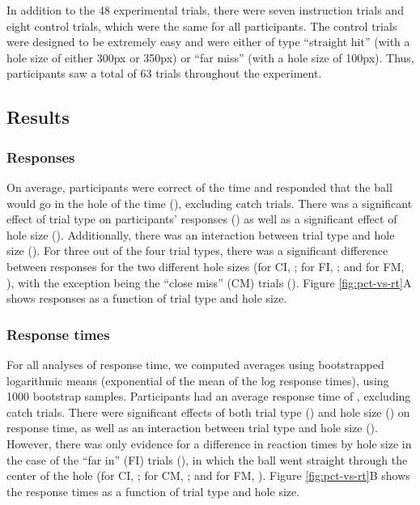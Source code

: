 \documentclass[10pt,letterpaper]{article}
\begin{document}
In addition to the 48 experimental trials, there were seven instruction trials and eight control trials, which were the same for all participants.
The control trials were designed to be extremely easy and were either of type ``straight hit'' (with a hole size of either 300px or 350px) or ``far miss'' (with a hole size of 100px).
Thus, participants saw a total of 63 trials throughout the experiment.

\subsection{Results}

\subsubsection{Responses}

On average, participants were correct \AvgCorrect{} of the time and responded that the ball would go in the hole \AvgResponse{} of the time (\ResponseN{}), excluding catch trials.
There was a significant effect of trial type on participants' responses (\ResponseHoleClass{}) as well as a significant effect of hole size (\ResponseHoleSize{}).
Additionally, there was an interaction between trial type and hole size (\ResponseFull{}).
For three out of the four trial types, there was a significant difference between responses for the two different hole sizes (for CI, \ResponseCIttest{}; for FI, \ResponseCIttest{}; and for FM, \ResponseFMttest{}), with the exception being the ``close miss'' (CM) trials (\ResponseCMttest{}).
Figure \ref{fig:pct-vs-rt}A shows responses as a function of trial type and hole size.

\subsubsection{Response times}

For all analyses of response time, we computed averages using bootstrapped logarithmic means (exponential of the mean of the log response times), using 1000 bootstrap samples.
Participants had an average response time of \AvgRT{}, excluding catch trials.
There were significant effects of both trial type (\RTHoleClass{}) and hole size (\RTHoleSize{}) on response time, as well as an interaction between trial type and hole size (\RTFull{}).
However, there was only evidence for a difference in reaction times by hole size in the case of the ``far in'' (FI) trials (\ResponsetimeFIttest{}), in which the ball went straight through the center of the hole (for CI, \ResponsetimeCIttest{}; for CM, \ResponsetimeCMttest{}; and for FM, \ResponsetimeFMttest{}).
Figure \ref{fig:pct-vs-rt}B shows the response times as a function of trial type and hole size.
\end{document}
